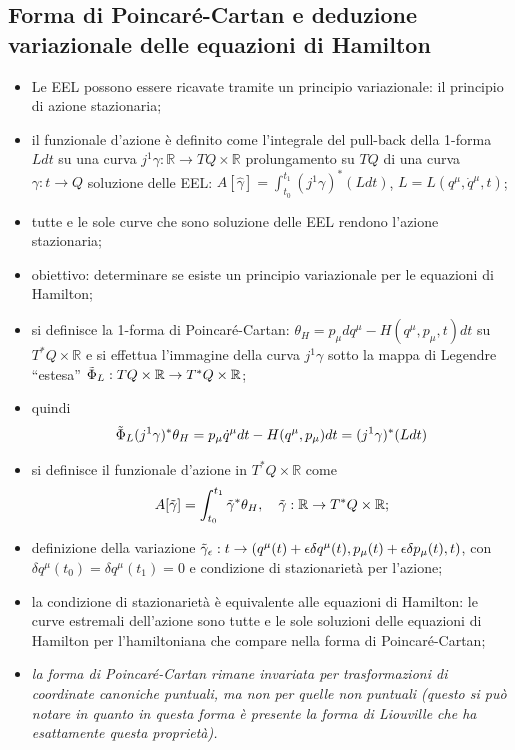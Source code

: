 \documentclass{article}
\theoremstyle{remark}
\begin{document}
\subsection{Forma di Poincaré-Cartan e deduzione variazionale delle equazioni di Hamilton}
\begin{itemize}
    \item Le EEL possono essere ricavate tramite un principio variazionale: il principio di azione stazionaria;
    \item il funzionale d'azione è definito come l'integrale del pull-back della 1-forma $Ldt$ su una curva $j^1\gamma:\mathbb{R}\to TQ\times\mathbb{R}$ prolungamento su $TQ$ di una curva $\gamma:t\to Q$ soluzione delle EEL: $A[\hat{\gamma}]=\int_{t_0}^{t_1}(j^1\gamma)^*(Ldt)$, $L=L(q^\mu,\dot{q}^\mu,t)$;
    \item tutte e le sole curve che sono soluzione delle EEL rendono l'azione stazionaria;
    \item obiettivo: determinare se esiste un principio variazionale per le equazioni di Hamilton;
    \item si definisce la 1-forma di Poincaré-Cartan: $\theta_H=p_\mu dq^\mu-H(q^\mu,p_\mu,t)dt$ su $T^*Q\times\mathbb{R}$ e si effettua l'immagine della curva $j^1\gamma$ sotto la mappa di Legendre ``estesa'' $\Tilde{\Phi}_L:TQ\times\mathbb{R}\to T^*Q\times\mathbb{R}$;
    \item quindi
    \begin{equation}
        \Tilde{\Phi}_L(j^1\gamma)^*\theta_H=p_\mu\dot{q}^\mu dt-H(q^\mu,p_\mu)dt=(j^1\gamma)^*(Ldt)
    \end{equation}
    \item si definisce il funzionale d'azione in $T^*Q\times\mathbb{R}$ come
    \begin{equation}
        A[\Tilde{\gamma}]=\int_{t_0}^{t_1}\Tilde{\gamma}^*\theta_H,\quad\Tilde{\gamma}:\mathbb{R}\to T^*Q\times\mathbb{R};
    \end{equation}
    \item definizione della variazione $\Tilde{\gamma}_\epsilon:t\to(q^\mu(t)+\epsilon\delta q^\mu(t),p_\mu(t)+\epsilon\delta p_\mu(t),t)$, con $\delta q^\mu(t_0)=\delta q^\mu(t_1)=0$ e condizione di stazionarietà per l'azione;
    \item la condizione di stazionarietà è equivalente alle equazioni di Hamilton: le curve estremali dell'azione sono tutte e le sole soluzioni delle equazioni di Hamilton per l'hamiltoniana che compare nella forma di Poincaré-Cartan;
    \item \textit{la forma di Poincaré-Cartan rimane invariata per trasformazioni di coordinate canoniche puntuali, ma non per quelle non puntuali (questo si può notare in quanto in questa forma è presente la forma di Liouville che ha esattamente questa proprietà).}
\end{itemize}
\end{document}
